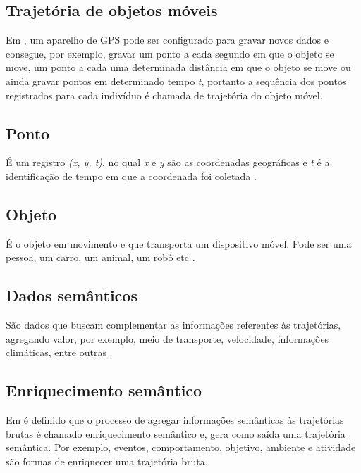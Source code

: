 \documentclass[	12pt, Times, openright, twoside, a4paper, english, brazil]{abntex2}
\begin{document}
\subsection{Trajetória de objetos móveis}
Em \cite{Bogorny2012}, um aparelho de GPS pode ser configurado para gravar novos dados e consegue, por exemplo, gravar um ponto a cada segundo em que o objeto se move, um ponto a cada uma determinada distância em que o objeto se move ou ainda gravar pontos em determinado tempo \textit{t}, portanto a sequência dos pontos registrados para cada indivíduo é chamada de trajetória do objeto móvel.

\subsection{Ponto}
É um registro \textit{(x, y, t)}, no qual \textit{x} e \textit{y} são as coordenadas geográficas e \textit{t} é a identificação de tempo em que a coordenada foi coletada \cite{Bogorny2014}.

\subsection{Objeto}
É o objeto em movimento e que transporta um dispositivo móvel. Pode
ser uma pessoa, um carro, um animal, um robô etc \cite{Bogorny2014}.

\subsection{Dados semânticos}
São dados que buscam complementar as informações referentes às trajetórias, agregando valor, por exemplo, meio de transporte, velocidade, informações climáticas, entre outras \cite{Bogorny2014}.

\subsection{Enriquecimento semântico}
Em \cite{Furletti2013} é definido que o processo de agregar informações semânticas às trajetórias brutas é chamado enriquecimento semântico e, gera como saída uma trajetória semântica. Por exemplo, eventos, comportamento, objetivo, ambiente e atividade são formas de enriquecer uma trajetória bruta.
\end{document}
